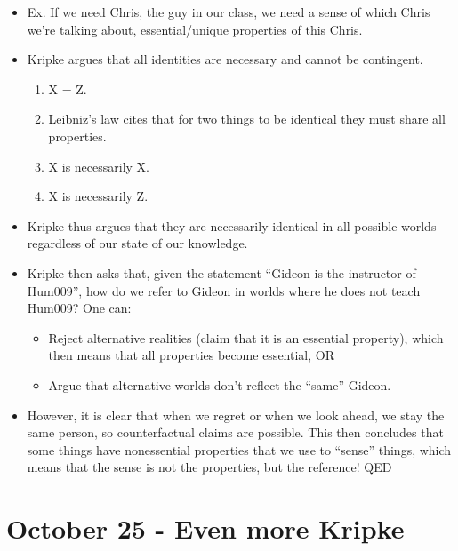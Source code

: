 \documentclass{report}
\begin{document}
\begin{itemize}
\item Ex. If we need Chris, the guy in our class, we need a sense of which Chris we're talking about, essential/unique properties of this Chris. 
\item Kripke argues that all identities are necessary and cannot be contingent. 
\begin{enumerate}
\item X = Z.
\item Leibniz's law cites that for two things to be identical they must share all properties. 
\item X is necessarily X.
\item X is necessarily Z.
\end{enumerate}
\item Kripke thus argues that they are necessarily identical in all possible worlds regardless of our state of our knowledge.
\item Kripke then asks that, given the statement ``Gideon is the instructor of Hum009'', how do we refer to Gideon in worlds where he does not teach Hum009? One can:
\begin{itemize}
\item Reject alternative realities (claim that it is an essential property), which then means that all properties become essential, OR
\item Argue that alternative worlds don't reflect the ``same'' Gideon. 
\end{itemize}
\item However, it is clear that when we regret or when we look ahead, we stay the same person, so counterfactual claims are possible. This then concludes that some things have nonessential properties that we use to ``sense'' things, which means that the sense is not the properties, but the reference! QED
\end{itemize}

\section{October 25 - Even more Kripke}
\end{document}
